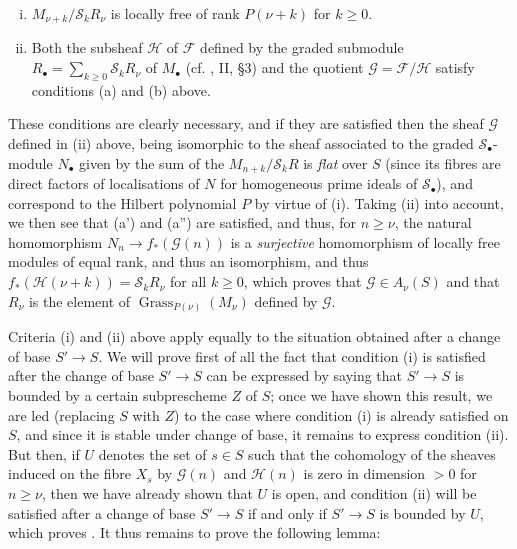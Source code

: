 \begin{enumerate}[i.]
  \item $M_{\nu+k}/\mathcal{S}_k R_\nu$ is locally free of rank $P(\nu+k)$ for $k\geqslant0$.
  \item Both the subsheaf $\mathcal{H}$ of $\mathcal{F}$ defined by the graded submodule $R_\bullet=\sum_{k\geqslant0}\mathcal{S}_kR_\nu$ of $M_\bullet$ (cf. \cite{GD1960}, II, §3) and the quotient $\mathcal{G}=\mathcal{F}/\mathcal{H}$ satisfy conditions (a) and (b) above.
\end{enumerate}

These conditions are clearly necessary, and if they are satisfied then the sheaf $\mathcal{G}$ defined in (ii) above, being isomorphic to the sheaf associated to the graded $\mathcal{S}_\bullet$-module $N_\bullet$ given by the sum of the $M_{n+k}/\mathcal{S}_kR$ is \emph{flat} over $S$ (since its fibres are direct factors of localisations of $N$ for homogeneous prime ideals of $\mathcal{S}_\bullet$), and correspond to the Hilbert polynomial $P$ by virtue of (i).
Taking (ii) into account, we then see that (a') and (a'') are satisfied, and thus, for $n\geqslant\nu$, the natural homomorphism $N_n\to f_*(\mathcal{G} (n))$ is a \emph{surjective} homomorphism of locally free modules of equal rank, and thus an isomorphism, and thus $f_*(\mathcal{H} (\nu+k))=\mathcal{S}_kR_\nu$ for all $k\geqslant0$, which proves that $\mathcal{G}\in A_\nu(S)$ and that $R_\nu$ is the element of $\operatorname{Grass}_{P(\nu)} (M_\nu)$ defined by $\mathcal{G}$.



Criteria (i) and (ii) above apply equally to the situation obtained after a change of base $S'\to S$.
We will prove first of all the fact that condition (i) is satisfied after the change of base $S'\to S$ can be expressed by saying that $S'\to S$ is bounded by a certain subprescheme $Z$ of $S$;
once we have shown this result, we are led (replacing $S$ with $Z$) to the case where condition (i) is already satisfied on $S$, and since it is stable under change of base, it remains to express condition (ii).
But then, if $U$ denotes the set of $s\in S$ such that the cohomology of the sheaves induced on the fibre $X_s$ by $\mathcal{G} (n)$ and $\mathcal{H} (n)$ is zero in dimension $>0$ for $n\geqslant\nu$, then we have already shown that $U$ is open, and condition (ii) will be satisfied after a change of base $S'\to S$ if and only if $S'\to S$ is bounded by $U$, which proves .
It thus remains to prove the following lemma:


